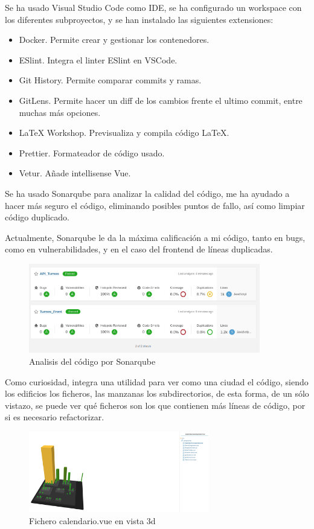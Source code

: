 \documentclass[11pt,spanish,listoffigures,listoftables]{tfgetsinf}
\begin{document}
Se ha usado Visual Studio Code como IDE, se ha configurado un workspace con los diferentes subproyectos, y se han instalado las siguientes extensiones:
\begin{itemize}
  \item Docker. Permite crear y gestionar los contenedores.
  \item ESlint. Integra el linter ESlint en VSCode.
  \item Git History. Permite comparar commits y ramas.
  \item GitLens. Permite hacer un diff de los cambios frente el ultimo commit, entre muchas más opciones.
  \item LaTeX Workshop. Previsualiza y compila código LaTeX.
  \item Prettier. Formateador de código usado.
  \item Vetur. Añade intellisense Vue.
\end{itemize}

Se ha usado Sonarqube para analizar la calidad del código, me ha ayudado a hacer más seguro el código, eliminando posibles puntos de fallo, así como limpiar código duplicado.

Actualmente, Sonarqube le da la máxima calificación a mi código, tanto en bugs, como en vulnerabilidades, y en el caso del frontend de líneas duplicadas.

\begin{figure}[h!] %
  \centering
   \includegraphics[width=0.90\textwidth]{img/estadosonar.png}
   \caption{Analisis del código por Sonarqube}
   \label{fig:estadosonar}
 \end{figure}
\clearpage
Como curiosidad, integra una utilidad para ver como una ciudad el código, siendo los edificios los ficheros, las manzanas los subdirectorios, de esta forma, de un sólo vistazo, se puede ver qué ficheros son los que contienen más líneas de código, por si es necesario refactorizar.

\begin{figure}[h!] %
  \centering
   \includegraphics[width=0.70\textwidth]{img/calendarioSonarqube.png}
   \caption{Fichero calendario.vue en vista 3d}
   \label{fig:calendariosonar}
 \end{figure}
\end{document}
